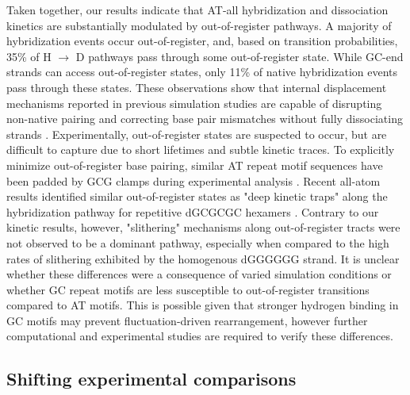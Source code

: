 \documentclass[journal=jpcbfk,manuscript=article]{achemso}
\begin{document}
Taken together, our results indicate that AT-all hybridization and dissociation kinetics are substantially modulated by out-of-register pathways. A majority of hybridization events occur out-of-register, and, based on transition probabilities, 35\% of H $\rightarrow$ D pathways pass through some out-of-register state. While GC-end strands can access out-of-register states, only 11\% of native hybridization events pass through these states. These observations show that internal displacement mechanisms reported in previous simulation studies are capable of disrupting non-native pairing and correcting base pair mismatches without fully dissociating strands \citep{Romano2013DNADependence, Markegard2015, Maciejczyk2014DNAModel}. Experimentally, out-of-register states are suspected to occur, but are difficult to capture due to short lifetimes and subtle kinetic traces. To explicitly minimize out-of-register base pairing, similar AT repeat motif sequences have been padded by GCG clamps during experimental analysis \cite{Wyer2014KineticsAT-tracts}. Recent all-atom results identified similar out-of-register states as "deep kinetic traps" along the hybridization pathway for repetitive dGCGCGC hexamers \citep{Xiao2019}. Contrary to our kinetic results, however, "slithering" mechanisms along out-of-register tracts were not observed to be a dominant pathway, especially when compared to the high rates of slithering exhibited by the homogenous dGGGGGG strand. It is unclear whether these differences were a consequence of varied simulation conditions or whether GC repeat motifs are less susceptible to out-of-register transitions compared to AT motifs. This is possible given that stronger hydrogen binding in GC motifs may prevent fluctuation-driven rearrangement, however further computational and experimental studies are required to verify these differences.

\subsection{Shifting experimental comparisons}
\end{document}
